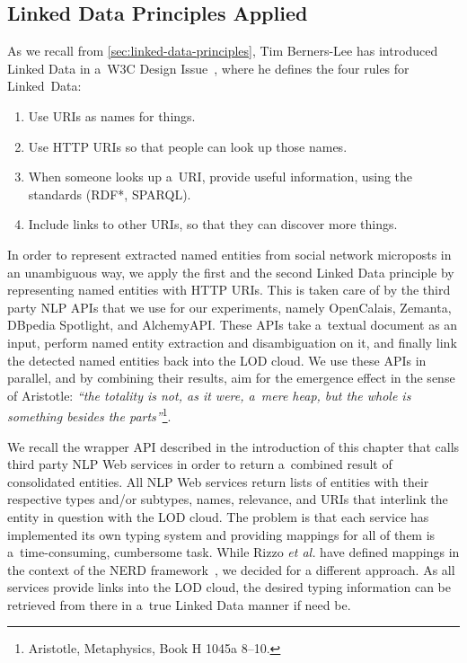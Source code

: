 \subsection{Linked Data Principles Applied}

As we recall from \autoref{sec:linked-data-principles}, 
Tim Berners-Lee has introduced Linked Data in a~W3C
Design Issue~\cite{bernerslee2006linkeddata},
where he defines the four rules for Linked~Data:

\begin{enumerate}
  \item Use URIs as names for things.
  \item Use HTTP URIs so that people can look up those names.
  \item When someone looks up a~URI, provide useful information, 
        using the standards (RDF*, SPARQL).
  \item Include links to other URIs, so that they can discover
        more things.
\end{enumerate}

In order to represent extracted named entities from
social network microposts in an unambiguous way,
we apply the first and the second Linked Data principle
by representing named entities with HTTP URIs.
This is taken care of by the third party NLP APIs
that we use for our experiments, namely OpenCalais,
Zemanta, DBpedia Spotlight, and AlchemyAPI.
These APIs take a~textual document as an input,
perform named entity extraction and disambiguation on it,
and finally link the detected named entities back
into the LOD cloud.
We use these APIs in parallel, and by combining their results,
aim for the emergence effect in the sense of Aristotle:
\textit{``the totality is not, as it were, a~mere heap,
but the whole is something besides the
parts''}\footnote{Aristotle, Metaphysics, Book H 1045a 8--10.}.

We recall the wrapper API described in the introduction of
this chapter that calls third party NLP Web services
in order to return a~combined result of consolidated entities.
All NLP Web services return lists of entities with
their respective types and/or subtypes, names,
relevance, and URIs that interlink the entity in question
with the LOD cloud.
The problem is that each service has implemented
its own typing system and providing mappings for all of them
is a~time-consuming, cumbersome task.
While Rizzo \emph{et al.} have defined mappings in the context
of the NERD framework~\cite{rizzo2011nerd,rizzo2012nerd},
we decided for a different approach.
As all services provide links into the LOD cloud,
the desired typing information can be retrieved from there
in a~true Linked Data manner if need be.

